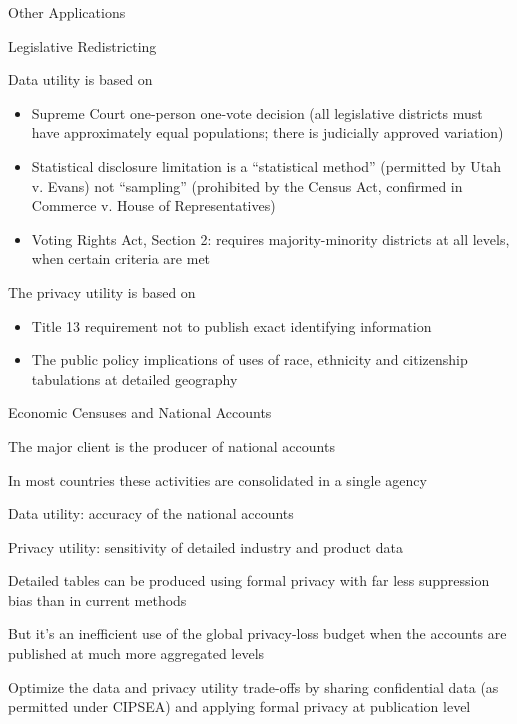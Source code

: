\begin{transitionframe}
  \begin{center}
    \Huge Other Applications
  \end{center}
\end{transitionframe}

\begin{frame}{Legislative Redistricting}
  \begin{wideitemize}
    \item Data utility is based on
    \begin{itemize}
        \item Supreme Court one-person one-vote decision (all legislative districts must have approximately equal populations; there is judicially approved variation)
        \item Statistical disclosure limitation is a “statistical method” (permitted by Utah v. Evans) not “sampling” (prohibited by the Census Act, confirmed in Commerce v. House of Representatives)
        \item Voting Rights Act, Section 2: requires majority-minority districts at all levels, when certain criteria are met
    \end{itemize}
    \item The privacy utility is based on
    \begin{itemize}
        \item Title 13 requirement not to publish exact identifying information
        \item The public policy implications of uses of race, ethnicity and citizenship tabulations at detailed geography
    \end{itemize}
  \end{wideitemize}
\end{frame}

\begin{frame}{Economic Censuses and National Accounts}
  \begin{wideitemize}
    \item The major client is the producer of national accounts
    \item In most countries these activities are consolidated in a single agency
    \item Data utility: accuracy of the national accounts
    \item Privacy utility: sensitivity of detailed industry and product data
    \item Detailed tables can be produced using formal privacy with far less suppression bias than in current methods
    \item But it's an inefficient use of the global privacy-loss budget when the accounts are published at much more aggregated levels
    \item Optimize the data and privacy utility trade-offs by sharing confidential data (as permitted under CIPSEA) and applying formal privacy at publication level
  \end{wideitemize}
\end{frame}

